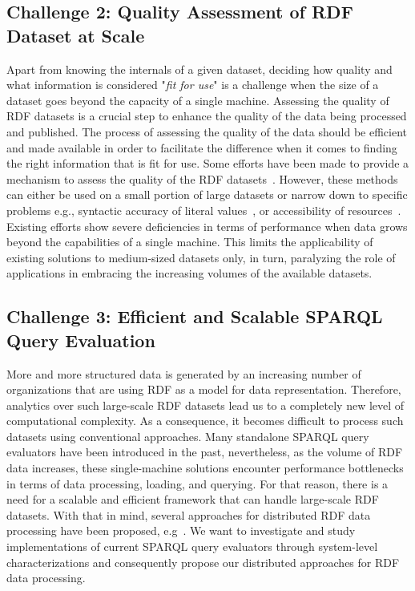 \subsection{Challenge 2: Quality Assessment of RDF Dataset at Scale}
\label{sec:c2}
Apart from knowing the internals of a given dataset, deciding how quality and what information is considered "\textit{fit for use}" is a challenge when the size of a dataset goes beyond the capacity of a single machine.
Assessing the quality of \gls{RDF} datasets is a crucial step to enhance the quality of the data being processed and published.
The process of assessing the quality of the data should be efficient and made available in order to facilitate the difference when it comes to finding the right information that is fit for use.
Some efforts have been made to provide a mechanism to assess the quality of the \gls{RDF} datasets~\cite{Debattista0AC18,farber2018,beek2018,debattista2016luzzu}.
However, these methods can either be used on a small portion of large datasets \cite{farber2018} or narrow down to specific problems e.g., syntactic accuracy of literal values~\cite{beek2018}, or accessibility of resources~\cite{Mihindukulasooriya2016LDSA}.
Existing efforts show severe deficiencies in terms of performance when data grows beyond the capabilities of a single machine.
This limits the applicability of existing solutions to medium-sized datasets only, in turn, paralyzing the role of applications in embracing the increasing volumes of the available datasets.

\subsection{Challenge 3: Efficient and Scalable SPARQL Query Evaluation}
\label{sec:c3}
More and more structured data is generated by an increasing number of organizations that are using \gls{RDF} as a model for data representation.
Therefore, analytics over such large-scale \gls{RDF} datasets lead us to a completely new level of computational complexity.
As a consequence, it becomes difficult to process such datasets using conventional approaches.
Many standalone \gls{SPARQL} query evaluators have been introduced in the past, nevertheless, as the volume of \gls{RDF} data increases, these single-machine solutions encounter performance bottlenecks in terms of data processing, loading, and querying.
For that reason, there is a need for a scalable and efficient framework that can handle large-scale \gls{RDF} datasets.
With that in mind, several approaches for distributed \gls{RDF} data processing have been proposed, e.g~\cite{sparqlgx-iswc-2016, Schatzle:2016:SRQ:2977797.2977806}.
We want to investigate and study implementations of current \gls{SPARQL} query evaluators through system-level characterizations and consequently propose our distributed approaches for \gls{RDF} data processing.

